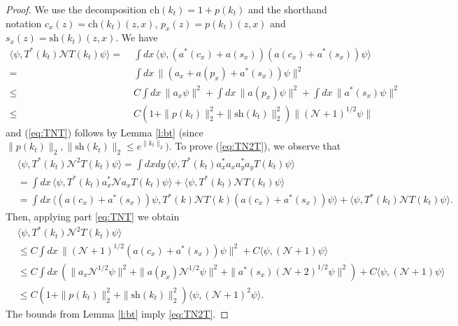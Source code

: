 \documentclass[11pt,a4paper]{article}
\newcommand{\N}{\mathcal{N}}
\begin{document}

\begin{proof}
We use the decomposition $\text{ch} (k_t) = 1 + p(k_t)$ and the shorthand notation $c_x(z) = \text{ch} (k_t) (z,x)$, $p_x(z) = p(k_t) (z,x)$ and $s_x(z) = \text{sh} (k_t) (z,x)$. We have
 \[\begin{split} 
  \langle \psi, T^* (k_t)  \N T (k_t) \psi \rangle = \; & \int dx \, \langle  \psi, (a^* (c_x) + a (s_x)) (a (c_x) + a^* (s_x)) \psi \rangle \\ = \; &\int dx \, \| (a_x + a(p_x) + a^*(s_x)) \psi
  \|^2 \\  \leq \; &C  \int dx \, \| a_x \psi \|^2
    + \int dx \, \| a(p_x) \psi \|^2 + \int dx \, \| a^*(s_x) \psi \|^2 \\
    \leq \; &C ( 1 + \| p (k_t) \|_2^2 + \| \text{sh} (k_t) \|_2^2 ) \| (\N + 1)^{1/2}  \psi \| 
      \end{split}\]
and (\ref{eq:TNT}) follows by Lemma \ref{l:bt} (since $\| p (k_t) \|_2, \| \text{sh} (k_t) \|_2 \leq e^{\| k_t \|_2})$. To prove (\ref{eq:TN2T}), we observe that 
\begin{align*}
 & \langle \psi, T^* (k_t) \N^2 T (k_t) \psi \rangle = \int dxdy \, \langle \psi, T^* (k_t)  a_x^* a_x a_y^* a_y T (k_t) \psi \rangle \\
    & = \int dx \, \langle \psi, T^* (k_t)  a_x^* \N a_x T (k_t) \psi \rangle + \langle
    \psi, T^* (k_t)  \N T (k_t) \psi \rangle \\
    & = \int dx \, \langle (a(c_x) + a^*(s_x)) \psi, T^* (k)  \N T (k) (a (c_x)  + a^*(s_x)) \psi \rangle + \langle \psi, T^* (k_t) \N T (k_t) \psi \rangle.
  \end{align*}
  Then, applying part \eqref{eq:TNT}  we obtain
  \begin{align*}
    & \langle \psi, T^* (k_t) \N^2 T (k_t) \psi \rangle \\
    & \leq C \int dx \, \| (\N+1)^{1/2} (a (c_x) +
    a^*(s_x)) \psi \|^2 + C \langle \psi, (\N+1) \psi \rangle \\
    & \leq C \int dx \, (\| a_x \N^{1/2} \psi \|^2 + \| a(p_x)
    \N^{1/2} \psi \|^2 + \| a^*(s_x) (\N+2)^{1/2} \psi \|^2 ) + C \langle
    \psi, (\N+1) \psi \rangle \\
    & \leq C(1 + \| p (k_t) \|_{2}^2 + \| \text{sh} (k_t)  \|_{2}^2) \langle \psi, (\N+1)^2
    \psi \rangle.
  \end{align*}
The bounds from Lemma \ref{l:bt} imply \eqref{eq:TN2T}.
\end{proof}
\end{document}
